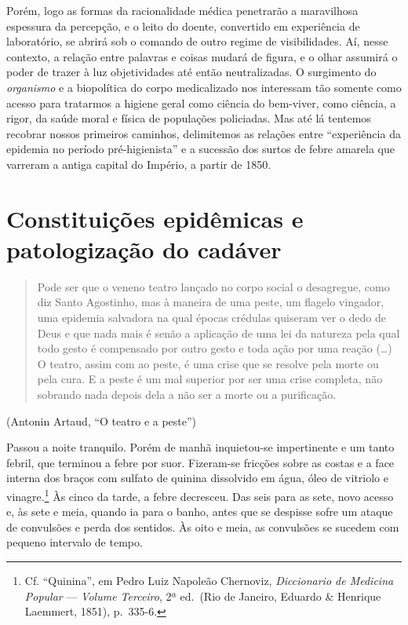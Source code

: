 Porém, logo as formas da racionalidade médica penetrarão a maravilhosa
espessura da percepção, e o leito do doente, convertido em experiência
de laboratório, se abrirá sob o comando de outro regime de
visibilidades. Aí, nesse contexto, a relação entre palavras e coisas
mudará de figura, e o olhar assumirá o poder de trazer à luz
objetividades até então neutralizadas. O surgimento do \textit{organismo}
e a biopolítica do corpo medicalizado nos interessam tão somente como
acesso para tratarmos a higiene geral como ciência do bem-viver, como
ciência, a rigor, da saúde moral e física de populações policiadas. Mas
até lá tentemos recobrar nossos primeiros caminhos, delimitemos as
relações entre ``experiência da epidemia no período pré-higienista'' e a
sucessão dos surtos de febre amarela que varreram a antiga capital do
Império, a partir de 1850.

\section*{Constituições epidêmicas e patologização do
cadáver}

\begin{quote}
Pode ser que o veneno teatro lançado no corpo social o desagregue, como
diz Santo Agostinho, mas à maneira de uma peste, um flagelo vingador,
uma epidemia salvadora na qual épocas crédulas quiseram ver o dedo de
Deus e que nada mais é senão a aplicação de uma lei da natureza pela
qual todo gesto é compensado por outro gesto e toda ação por uma reação
(\ldots{}) O teatro, assim com ao peste, é uma crise que se resolve pela
morte ou pela cura. E a peste é um mal superior por ser uma crise
completa, não sobrando nada depois dela a não ser a morte ou a
purificação.
\end{quote}

(Antonin Artaud, ``O teatro e a peste'')

Passou a noite tranquilo. Porém de manhã inquietou-se impertinente e um
tanto febril, que terminou a febre por suor. Fizeram-se fricções sobre
as costas e a face interna dos braços com sulfato de quinina dissolvido
em água, óleo de vitriolo e vinagre.\footnote{Cf. ``Quinina'', em Pedro
  Luiz Napoleão Chernoviz, \textit{Diccionario de Medicina Popular} ---
  \textit{Volume Terceiro}, 2ª ed.~(Rio de Janeiro, Eduardo \& Henrique
  Laemmert, 1851), p.~335-6.} Às cinco da tarde, a febre decresceu. Das
seis para as sete, novo acesso e, às sete e meia, quando ia para o
banho, antes que se despisse sofre um ataque de convulsões e perda dos
sentidos. Às oito e meia, as convulsões se sucedem com pequeno intervalo
de tempo.

